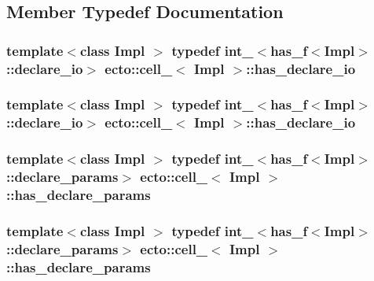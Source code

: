 \subsection{Member Typedef Documentation}
\hypertarget{structecto_1_1cell___a10ab0d3f85e194d548beb3251416a569}{
\subsubsection[{has\-\_\-declare\-\_\-io}]{\setlength{\rightskip}{0pt plus 5cm}template$<$class Impl $>$ typedef {\bf int\-\_\-}$<${\bf has\-\_\-f}$<$Impl$>$\-::{\bf declare\-\_\-io}$>$ {\bf ecto\-::cell\-\_\-}$<$ Impl $>$\-::{\bf has\-\_\-declare\-\_\-io}}}\label{structecto_1_1cell___a10ab0d3f85e194d548beb3251416a569}
\hypertarget{structecto_1_1cell___a10ab0d3f85e194d548beb3251416a569}{
\subsubsection[{has\-\_\-declare\-\_\-io}]{\setlength{\rightskip}{0pt plus 5cm}template$<$class Impl $>$ typedef {\bf int\-\_\-}$<${\bf has\-\_\-f}$<$Impl$>$\-::{\bf declare\-\_\-io}$>$ {\bf ecto\-::cell\-\_\-}$<$ Impl $>$\-::{\bf has\-\_\-declare\-\_\-io}}}\label{structecto_1_1cell___a10ab0d3f85e194d548beb3251416a569}
\hypertarget{structecto_1_1cell___ab7b111eb2672ae4eaacc668852b8b89f}{
\subsubsection[{has\-\_\-declare\-\_\-params}]{\setlength{\rightskip}{0pt plus 5cm}template$<$class Impl $>$ typedef {\bf int\-\_\-}$<${\bf has\-\_\-f}$<$Impl$>$\-::{\bf declare\-\_\-params}$>$ {\bf ecto\-::cell\-\_\-}$<$ Impl $>$\-::{\bf has\-\_\-declare\-\_\-params}}}\label{structecto_1_1cell___ab7b111eb2672ae4eaacc668852b8b89f}
\hypertarget{structecto_1_1cell___ab7b111eb2672ae4eaacc668852b8b89f}{
\subsubsection[{has\-\_\-declare\-\_\-params}]{\setlength{\rightskip}{0pt plus 5cm}template$<$class Impl $>$ typedef {\bf int\-\_\-}$<${\bf has\-\_\-f}$<$Impl$>$\-::{\bf declare\-\_\-params}$>$ {\bf ecto\-::cell\-\_\-}$<$ Impl $>$\-::{\bf has\-\_\-declare\-\_\-params}}}\label{structecto_1_1cell___ab7b111eb2672ae4eaacc668852b8b89f}
